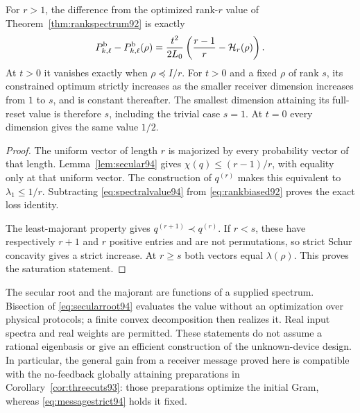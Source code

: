 \begin{corollary}\label{cor:spectralsaturation94}
For $r>1$, the difference from the optimized rank-$r$ value of
Theorem~\ref{thm:rankspectrum92} is exactly
\begin{equation}\label{eq:exactspectralloss94}
 P_{k,\ell}^{\rm b}-P_{k,\ell}^{\rm b}(\rho)
       =\frac{t^2}{2L_0}\left(\frac{r-1}{r}-\mathcal H_r(\rho)\right).
\end{equation}
At $t>0$ it vanishes exactly when $\rho\preceq I/r$.
For $t>0$ and a fixed $\rho$ of rank $s$, its constrained optimum strictly
increases as the smaller receiver dimension increases from $1$ to
$s$, and is constant thereafter.  The smallest dimension attaining
its full-reset value is therefore $s$, including the trivial case
$s=1$.  At $t=0$ every dimension gives the same value $1/2$.
\end{corollary}
\begin{proof}
The uniform vector of length $r$ is majorized by every probability
vector of that length.  Lemma~\ref{lem:secular94} gives
$\chi(q)\le(r-1)/r$, with equality only at that uniform vector.
The construction of $q^{(r)}$ makes this equivalent to
$\lambda_1\le1/r$.  Subtracting \eqref{eq:spectralvalue94} from
\eqref{eq:rankbiased92} proves the exact loss identity.

The least-majorant property gives
$q^{(r+1)}\prec q^{(r)}$.  If $r<s$, these have respectively $r+1$
and $r$ positive entries and are not permutations, so strict Schur
concavity gives a strict increase.  At $r\ge s$ both vectors equal
$\lambda(\rho)$.  This proves the saturation statement.
\end{proof}

The secular root and the majorant are functions of a supplied spectrum.
Bisection of \eqref{eq:secularroot94} evaluates the value without an
optimization over physical protocols; a finite convex decomposition
then realizes it.  Real input spectra and real weights are permitted.
These statements do not assume a rational eigenbasis or give an
efficient construction of the unknown-device design.  In particular,
the general gain from a receiver message proved here is compatible
with the no-feedback globally attaining preparations in
Corollary~\ref{cor:threecuts93}: those preparations optimize the initial
Gram, whereas \eqref{eq:messagestrict94} holds it fixed.
